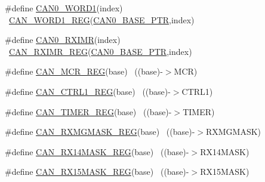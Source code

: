 \begin{DoxyCompactItemize}
\item 
\#define \hyperlink{group___c_a_n___register___accessor___macros_ga4af1bfb5724c2c008255212b870e19f1}{C\+A\+N0\+\_\+\+W\+O\+R\+D1}(index)                                            ~\hyperlink{group___c_a_n___register___accessor___macros_gabea0fd7f957d3c4e7770f1670aff54dc}{C\+A\+N\+\_\+\+W\+O\+R\+D1\+\_\+\+R\+EG}(\hyperlink{group___c_a_n___peripheral_ga1ee8f499e10af9b8e3132e0168e519b9}{C\+A\+N0\+\_\+\+B\+A\+S\+E\+\_\+\+P\+TR},index)
\item 
\#define \hyperlink{group___c_a_n___register___accessor___macros_ga90e907f58584ed65f8c8cd1ab79e4fc4}{C\+A\+N0\+\_\+\+R\+X\+I\+MR}(index)                                            ~\hyperlink{group___c_a_n___register___accessor___macros_gabcdb674583aff011e9cae0837f6abd5a}{C\+A\+N\+\_\+\+R\+X\+I\+M\+R\+\_\+\+R\+EG}(\hyperlink{group___c_a_n___peripheral_ga1ee8f499e10af9b8e3132e0168e519b9}{C\+A\+N0\+\_\+\+B\+A\+S\+E\+\_\+\+P\+TR},index)
\item 
\#define \hyperlink{group___c_a_n___register___accessor___macros_ga266f3270836a0e2113e665b27e8469c3}{C\+A\+N\+\_\+\+M\+C\+R\+\_\+\+R\+EG}(base)                                            ~((base)-\/$>$M\+CR)
\item 
\#define \hyperlink{group___c_a_n___register___accessor___macros_gacb8258cf058657f2e55abcfb40b99344}{C\+A\+N\+\_\+\+C\+T\+R\+L1\+\_\+\+R\+EG}(base)                                        ~((base)-\/$>$C\+T\+R\+L1)
\item 
\#define \hyperlink{group___c_a_n___register___accessor___macros_ga1fed1cd31d16a8d3472d1f4f424b4fc8}{C\+A\+N\+\_\+\+T\+I\+M\+E\+R\+\_\+\+R\+EG}(base)                                        ~((base)-\/$>$T\+I\+M\+ER)
\item 
\#define \hyperlink{group___c_a_n___register___accessor___macros_gadda1f2634abb5b3f2d33cd29632be22e}{C\+A\+N\+\_\+\+R\+X\+M\+G\+M\+A\+S\+K\+\_\+\+R\+EG}(base)                                  ~((base)-\/$>$R\+X\+M\+G\+M\+A\+SK)
\item 
\#define \hyperlink{group___c_a_n___register___accessor___macros_gaf9d566ee0a69baad94e2c8c8ae19b832}{C\+A\+N\+\_\+\+R\+X14\+M\+A\+S\+K\+\_\+\+R\+EG}(base)                                  ~((base)-\/$>$R\+X14\+M\+A\+SK)
\item 
\#define \hyperlink{group___c_a_n___register___accessor___macros_ga005001dc3329b0e1fb9488ebf352e109}{C\+A\+N\+\_\+\+R\+X15\+M\+A\+S\+K\+\_\+\+R\+EG}(base)                                  ~((base)-\/$>$R\+X15\+M\+A\+SK)
\item 

\end{DoxyCompactItemize}
